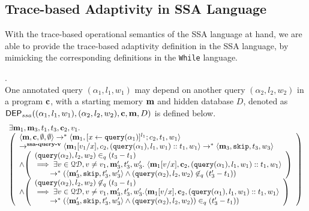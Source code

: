 \documentclass[a4paper,11pt]{article}
\begin{document}
\subsection{Trace-based Adaptivity in SSA Language}
With the trace-based operational semantics of the SSA language at hand, we are able to provide the trace-based adaptivity definition in the SSA language,
by mimicking the corresponding definitions in the {\tt While} language.
\begin{defn}
.
\\
{
One annotated query $({\alpha}_1, l_1, w_1)$ may depend on another query $({\alpha}_2,l_2, w_2)$ in a program $\boldsymbol{\mathbf{c}}$,
with a starting memory $\boldsymbol{\mathbf{m}}$ and  hidden database $D$, denoted as 
%
$\mathsf{DEP}_{ssa}({(\alpha_1, l_1, w_1)}, ({\alpha}_2, l_2, w_2), \boldsymbol{\mathbf{c}}, \boldsymbol{\mathbf{m}}, D)$ is defined below. 
%
%
\[
\begin{array}{l}
\exists \ssa{m}_1,\ssa{m}_3,t_1,t_3,\ssa{c}_2,v_1.\\
  \left (\begin{array}{l}   
\config{\ssa{m}, \ssa{c}, \emptyset ,\emptyset} \rightarrow^{*} 
\config{\ssa{m}_1, [\assign{x}{\query({\alpha}_1)}]^{l_1} ; c_2,
  t_1, w_1} 
\\ 
\rightarrow^{\textbf{{ssa-query-v}}} 
\config{\ssa{m}_1[v_1/x], c_2,
(\query({\alpha}_1),l_1, w_1)::t_1, w_1} \rightarrow^{*} \config{\ssa{m}_3, \eskip,
t_3,w_3}
 \\ \land
  \left( 
  \begin{array}{l}
  (\query({\alpha}_2),l_2,w_2) \in_{q} (t_3-t_1) 
  \\
  \implies 
  \exists v \in \qdom, v \neq v_1, \ssa{m}_3', t_3', w_3'. ~  
  \config{\ssa{m}_1[v/x], {\ssa{c}_2}, (\query({\alpha}_1),l_1, w_1)::t_1, w_1} 
  \\ 
  \quad \quad 
  \rightarrow^{*}
  (\config{\ssa{m}_3', \eskip, t_3', w_3'} 
  \land 
  (\query({\alpha}_2),l_2,w_2) \not \in_{q} (t_3'-t_1))
\end{array} \right )
\\\land
\left( 
  \begin{array}{l}
	(\query({\qval}_2),l_2,w_2) \not\in_{q} (t_3-t_1)
  	\\
  	\implies 
	\exists v \in \qdom, v \neq v_1, \ssa{m}_3', t_3', w_3'. 
	\config{\ssa{m}_1[v/x], {\ssa{c}_2}, (\query({\qval}_1),l_1,w_1)::t_1, w_1}
	\\ 
	\quad \quad 
	\rightarrow^{*} 
	(\config{\ssa{m}_3', \eskip, t_3', w_3'} 
	\land 
	(\query({\qval}_2),l_2,w_2))  \in_{q} (t_3'-t_1))
\end{array} \right )
\end{array} \right )
\end{array}
\]
}
\end{defn}
\end{document}
